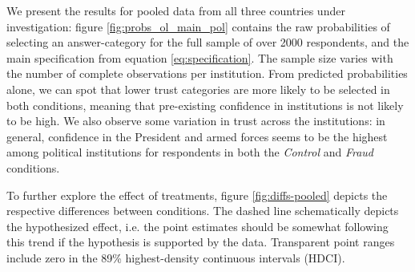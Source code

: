 \documentclass[11pt, ngerman,english,a4]{article}
\begin{document}
We present the results for pooled data from all three countries under investigation: figure \ref{fig:probs_ol_main_pol} contains the raw probabilities of selecting an answer-category for the full sample of over 2000 respondents, and the main specification from equation \ref{eq:specification}. 
The sample size varies with the number of complete observations per institution. 
From  predicted probabilities alone, we can spot that lower trust categories are more likely to be selected in both conditions, meaning that pre-existing confidence in institutions is not likely to be high. 
We also observe some variation in trust across the institutions: in general, confidence in the President and armed forces seems to be the highest among political institutions for respondents in both the \textit{Control} and \textit{Fraud} conditions. 

To further explore the effect of treatments, figure \ref{fig:diffs-pooled} depicts the respective differences between conditions. 
The dashed line schematically depicts the hypothesized effect, i.e. the point estimates should be somewhat following this trend if the hypothesis is supported by the data. 
Transparent point ranges include zero in the 89\% highest-density continuous intervals (HDCI). 

\end{document}
